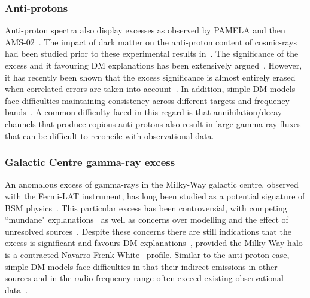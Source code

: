 \documentclass[10pt]{article}
\begin{document}
\subsubsection{Anti-protons}
%
Anti-proton spectra also display excesses as observed by PAMELA and then AMS-02~\cite{PAMELA:2011mvy,Aguilar:2016kjl}. The impact of dark matter on the anti-proton content of cosmic-rays had been studied prior to these experimental results in~\cite{Bringmann:2006im}. The significance of the excess and it favouring DM explanations has been extensively argued~\cite{Hooper:2014ysa,Giesen:2015ufa,Cirelli:2014lwa,Ishiwata:2019aet,Cuoco:2016eej,Cuoco:2017rxb,Cui:2016ppb,Cholis:2019ejx}. However, it has recently been shown that the excess significance is almost entirely erased when correlated errors are taken into account~\cite{Heisig:2020nse}. In addition, simple DM models face difficulties maintaining consistency across different targets and frequency bands~\cite{Beck:2015rna,Beck:2019imo}. A common difficulty faced in this regard is that annihilation/decay channels that produce copious anti-protons also result in large gamma-ray fluxes that can be difficult to reconcile with observational data. 


\subsubsection{Galactic Centre gamma-ray excess}
%
An anomalous excess of gamma-rays in the Milky-Way galactic centre, observed with the Fermi-LAT instrument, has long been studied as a potential signature of BSM physics~\cite{Hooper:2010mq,Hooper:2011ti,Abazajian:2012pn,Daylan:2014rsa,Calore:2014xka,Fermi-LAT:2017opo}. This particular excess has been controversial, with competing ``mundane" explanations~\cite{OLeary:2015qpx,Bartels:2015aea} as well as concerns over modelling and the effect of unresolved sources~\cite{Boyarsky:2010dr,Macias:2013vya,Zhou:2014lva,Brandt:2015ula,Lee:2015fea}. Despite these concerns there are still indications that the excess is significant and favours DM explanations~\cite{DiMauro:2021raz}, provided the Milky-Way halo is a contracted Navarro-Frenk-White~\cite{Navarro:1995iw} profile. Similar to the anti-proton case, simple DM models face difficulties in that their indirect emissions in other sources and in the radio frequency range often exceed existing observational data~\cite{Beck:2015rna,Beck:2017wxu,Beck:2019imo}.
\end{document}
